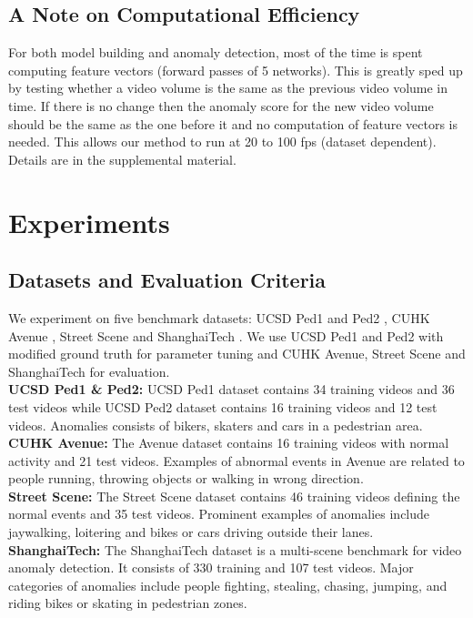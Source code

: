 \subsection{A Note on Computational Efficiency}

For both model building and anomaly detection, most of the time is spent computing feature vectors (forward passes of 5 networks).  This is greatly sped up by testing whether a video volume is the same as the previous video volume in time.  If there is no change then the anomaly score for the new video volume should be the same as the one before it and no computation of feature vectors is needed.  This allows our method to run at 20 to 100 fps (dataset dependent).  Details are in the supplemental material.



\section{Experiments}
\subsection{Datasets and Evaluation Criteria}
We experiment on five benchmark datasets: UCSD Ped1 and Ped2 \cite{mahadevan2010anomaly}, CUHK  Avenue \cite{lu2013abnormal}, Street Scene \cite{ramachandra2020street} and ShanghaiTech \cite{luo2017revisit}. We use UCSD Ped1 and Ped2 with modified ground truth for parameter tuning and CUHK Avenue, Street Scene and ShanghaiTech for evaluation.
\\
\textbf{UCSD Ped1 \& Ped2:}  UCSD Ped1 dataset contains 34 training videos and 36 test videos while UCSD Ped2 dataset contains 16 training videos and 12 test videos. Anomalies consists of bikers, skaters and cars in a pedestrian area.
\\
\textbf{CUHK Avenue:} The Avenue \cite{lu2013abnormal} dataset contains 16 training videos with normal activity and 21 test videos. Examples of abnormal events in Avenue are related to people running, throwing objects or walking in wrong direction.
\\
\textbf{Street Scene:} The Street Scene \cite{ramachandra2020street} dataset contains 46 training videos defining the normal events and 35 test videos. Prominent examples of anomalies include jaywalking, loitering and bikes or cars driving outside their lanes.
\\
\textbf{ShanghaiTech:} The ShanghaiTech \cite{luo2017revisit} dataset is a multi-scene benchmark for video anomaly detection. It consists of 330 training and 107 test videos. Major categories of anomalies include people fighting, stealing, chasing, jumping, and riding bikes or skating in pedestrian zones.

